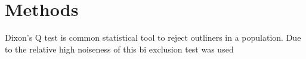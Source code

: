 \chapter{Methods}

Dixon's Q test is common statistical tool to reject outliners in a population. Due to the relative high noiseness of this bi exclusion test was used 
